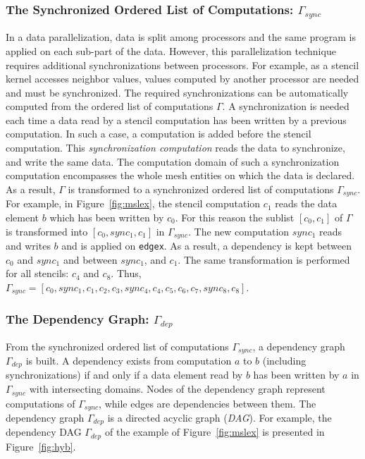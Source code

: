 \subsubsection*{The Synchronized Ordered List of Computations: $\Gamma_{sync}$}
In a data parallelization, data is split among processors and the same program is applied on each sub-part of the data.
However, this parallelization technique requires additional synchronizations between processors.
For example, as a stencil kernel accesses neighbor values, values computed by another processor are needed and must be synchronized. 
The required synchronizations can be automatically computed from the ordered list of computations $\Gamma$.
A synchronization is needed each time a data read by a stencil computation has been written by a previous computation. In such a case, a computation is added before the stencil computation. This \emph{synchronization computation} reads the data to synchronize, and write the same data. The computation domain of such a synchronization computation encompasses the whole mesh entities on which the data is declared. As a result, $\Gamma$ is transformed to a synchronized ordered list of computations $\Gamma_{sync}$.
For example, in Figure~\ref{fig:mslex}, the stencil computation $c_1$ reads the data element $b$ which has been written by $c_0$. For this reason the sublist $[c_0,c_1]$ of $\Gamma$ is transformed into $[c_0,sync_1,c_1]$ in $\Gamma_{sync}$. The new computation $sync_1$ reads and writes $b$ and is applied on \texttt{edgex}. As a result, a dependency is kept between $c_0$ and $sync_1$ and between $sync_1$, and $c_1$. The same transformation is performed for all stencils: $c_4$ and $c_8$. Thus, $\Gamma_{sync} = [c_0,sync_1,c_1,c_2,c_3,sync_4,c_4,c_5,c_6,c_7,sync_8,c_8]$.

\subsubsection*{The Dependency Graph: $\Gamma_{dep}$}
From the synchronized ordered list of computations $\Gamma_{sync}$, a dependency graph $\Gamma_{dep}$ is built.
A dependency exists from computation $a$ to $b$ (including synchronizations) if and only if a data element read by $b$ has been written by $a$ in $\Gamma_{sync}$ with intersecting domains.
Nodes of the dependency graph represent computations of $\Gamma_{sync}$, while edges are dependencies between them. The dependency graph $\Gamma_{dep}$ is a directed acyclic graph (\emph{DAG}). For example, the dependency DAG $\Gamma_{dep}$ of the example of Figure~\ref{fig:mslex} is presented in Figure~\ref{fig:hyb}.

